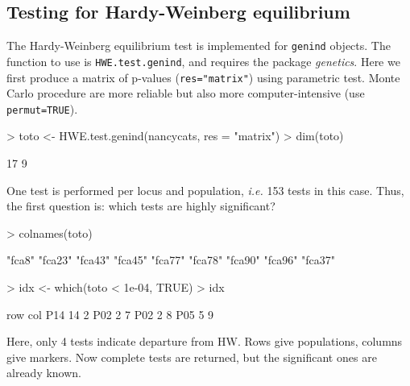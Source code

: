 \documentclass{article}
\begin{document}
\subsection{Testing for Hardy-Weinberg equilibrium}
The Hardy-Weinberg equilibrium test is implemented for \texttt{genind} objects.
The function to use is \texttt{HWE.test.genind}, and requires the package \emph{genetics}.
Here we first produce a matrix of p-values (\texttt{res="matrix"}) using parametric test.
Monte Carlo procedure are more reliable but also more computer-intensive (use \texttt{permut=TRUE}).
\begin{Schunk}
\begin{Sinput}
> toto <- HWE.test.genind(nancycats, res = "matrix")
> dim(toto)
\end{Sinput}
\begin{Soutput}
[1] 17  9
\end{Soutput}
\end{Schunk}
One test is performed per locus and population, \textit{i.e.} 153 tests in this case.
Thus, the first question is: which tests are highly significant?
\begin{Schunk}
\begin{Sinput}
> colnames(toto)
\end{Sinput}
\begin{Soutput}
[1] "fca8"  "fca23" "fca43" "fca45" "fca77" "fca78" "fca90" "fca96" "fca37"
\end{Soutput}
\begin{Sinput}
> idx <- which(toto < 1e-04, TRUE)
> idx
\end{Sinput}
\begin{Soutput}
    row col
P14  14   2
P02   2   7
P02   2   8
P05   5   9
\end{Soutput}
\end{Schunk}
Here, only 4 tests indicate departure from HW.
Rows give populations, columns give markers.
Now complete tests are returned, but the significant ones are already known.
\end{document}
